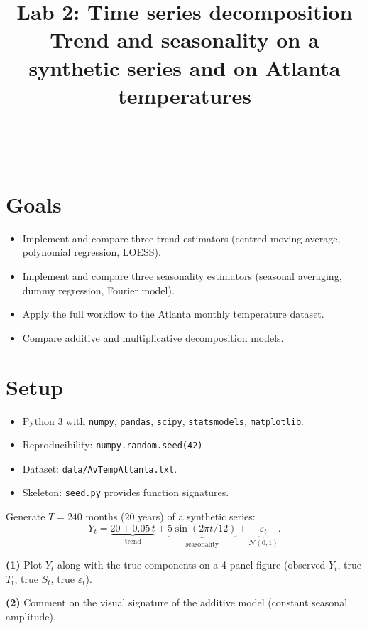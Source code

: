 \documentclass[a4paper,11pt]{article}
\title{Lab 2: Time series decomposition\\
\large Trend and seasonality on a synthetic series and on Atlanta temperatures}
\author{\auteurNom\\\auteurEmail\\\auteurInstitution}
\date{\anneeUniversitaire}
\begin{document}
\maketitle

\section*{Goals}
\begin{itemize}
  \item Implement and compare three trend estimators
        (centred moving average, polynomial regression, LOESS).
  \item Implement and compare three seasonality estimators
        (seasonal averaging, dummy regression, Fourier model).
  \item Apply the full workflow to the Atlanta monthly
        temperature dataset.
  \item Compare additive and multiplicative decomposition models.
\end{itemize}

\section*{Setup}
\begin{itemize}
  \item Python 3 with \texttt{numpy}, \texttt{pandas}, \texttt{scipy},
        \texttt{statsmodels}, \texttt{matplotlib}.
  \item Reproducibility: \texttt{numpy.random.seed(42)}.
  \item Dataset: \texttt{data/AvTempAtlanta.txt}.
  \item Skeleton: \texttt{seed.py} provides function signatures.
\end{itemize}

\begin{exercise}
Generate $T = 240$ months ($20$ years) of a synthetic series:
\[
  Y_t = \underbrace{20 + 0.05\, t}_{\text{trend}}
      + \underbrace{5 \sin(2\pi t / 12)}_{\text{seasonality}}
      + \underbrace{\varepsilon_t}_{\mathcal{N}(0, 1)}.
\]

\textbf{(1)} Plot $Y_t$ along with the true components on a 4-panel figure
(observed $Y_t$, true $T_t$, true $S_t$, true $\varepsilon_t$).

\textbf{(2)} Comment on the visual signature of the additive model
(constant seasonal amplitude).
\end{exercise}
\end{document}
